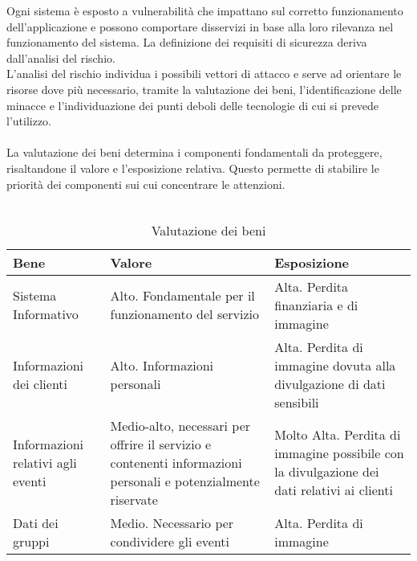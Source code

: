 Ogni sistema è esposto a vulnerabilità che impattano sul corretto funzionamento dell'applicazione
e possono comportare disservizi in base alla loro rilevanza nel funzionamento del sistema.
La definizione dei requisiti di sicurezza deriva dall'analisi del rischio.\\
L'analisi del rischio individua i possibili vettori di attacco e serve ad orientare le risorse dove più necessario,
tramite la valutazione dei beni, l'identificazione delle minacce e
l'individuazione dei punti deboli delle tecnologie di cui si prevede l'utilizzo.\\
\\
La valutazione dei beni determina i componenti fondamentali da proteggere,
risaltandone il valore e l'esposizione relativa.
Questo permette di stabilire le priorità dei componenti sui cui concentrare le attenzioni.\\
\\
\begin{table}[htb]
    \begin{tabular} {|P{3.5cm}|P{5.5cm}|P{6.7cm}|}
        \hline
        \textbf{Bene}                     & \textbf{Valore}                                                                                              & \textbf{Esposizione}      \\
        \hline
        Sistema Informativo               & Alto. Fondamentale per il funzionamento del servizio                                                         &
        Alta. Perdita finanziaria e di immagine                                                                                                                                      \\
        \hline
        Informazioni dei clienti          & Alto. Informazioni personali                                                                                 &
        Alta. Perdita di immagine dovuta alla divulgazione
        di dati sensibili                                                                                                                                                            \\
        \hline
        Informazioni relativi agli eventi & Medio-alto, necessari per offrire il servizio e contenenti informazioni personali e potenzialmente riservate &
        Molto Alta. Perdita di immagine possibile con la divulgazione dei dati relativi ai
        clienti                                                                                                                                                                      \\
        \hline
        Dati dei gruppi                   & Medio. Necessario per condividere gli eventi                                                                 & Alta. Perdita di immagine \\
        \hline
    \end{tabular}
    \caption{Valutazione dei beni}
\end{table}

